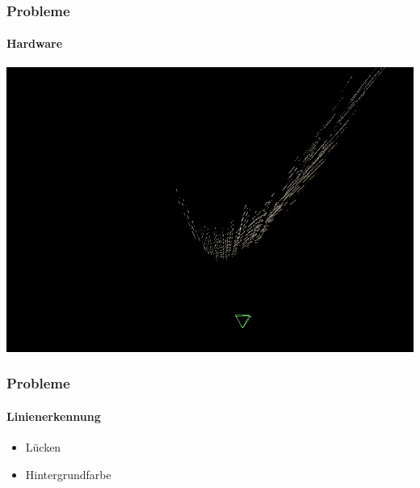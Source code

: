 \documentclass[xcolor=dvipsnames]{beamer}
\begin{document}
\begin{frame}
	\frametitle{Probleme}
	\framesubtitle{Hardware}

	\includegraphics[width=\linewidth]{includes/krumm.png}

\end{frame}


\begin{frame}
	\frametitle{Probleme}
	\framesubtitle{Linienerkennung}

	\begin{itemize}
		\item Lücken
		\item Hintergrundfarbe
	\end{itemize}

\end{frame}

\end{document}
